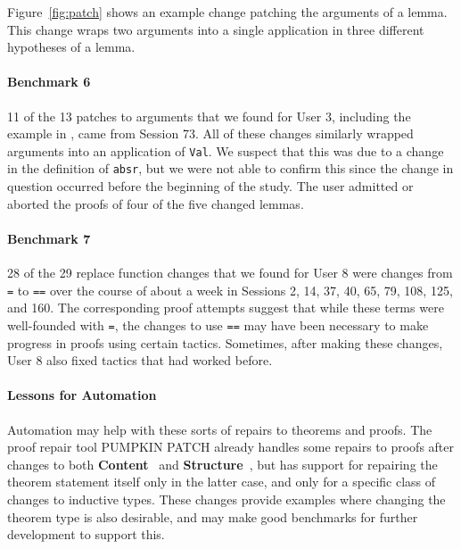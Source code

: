 Figure~\ref{fig:patch} shows an example change patching the arguments
of a lemma. This change wraps two arguments into a single application
in three different hypotheses of a lemma.

\paragraph{Benchmark 6}

11 of the 13 patches to arguments that we found for User 3,
including the example in , came from Session 73.
All of these changes similarly wrapped arguments into an application of
\lstinline{Val}.
We suspect that this was due to a change in the definition of \lstinline{absr},
but we were not able to confirm this since
the change in question occurred before the beginning of the study.
The user admitted or aborted the proofs of four of the five
changed lemmas.

\paragraph{Benchmark 7}

28 of the 29 replace function changes that we found for User 8
were changes from \lstinline{=} to \lstinline{==} over
the course of about a week in Sessions
2, 14, 37, 40, 65, 79, 108, 125, and 160.
The corresponding proof attempts suggest that while these terms were well-founded with \lstinline{=}, the changes to use \lstinline{==}
may have been necessary to make progress in proofs
using certain tactics.
Sometimes, after making these changes, User 8 also fixed tactics
that had worked before.

\paragraph{Lessons for Automation}

Automation may help with these sorts of repairs to theorems
and proofs. The proof repair tool \textsc{PUMPKIN PATCH} already handles some
repairs to proofs after changes to both
\textbf{Content}~\cite{Ringer2018} and \textbf{Structure}~\cite{Ringer2019}, but has support for repairing the theorem statement itself only in
the latter case, and only for a specific class of changes to inductive types.
These changes provide examples where changing the theorem type is also
desirable, and may make good benchmarks for further development
to support this.


